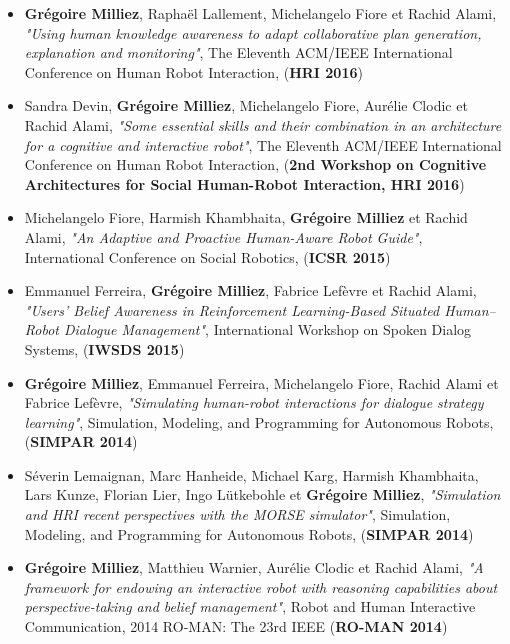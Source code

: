 \documentclass[a4paper,11pt,twoside]{StyleThese}
\begin{document}
\begin{itemize}
\item \textbf{Grégoire Milliez}, Raphaël Lallement, Michelangelo Fiore et Rachid Alami, \textit{"Using human knowledge awareness to adapt collaborative plan generation, explanation and monitoring"}, The Eleventh ACM/IEEE International Conference on Human Robot Interaction, (\textbf{HRI 2016})
\item Sandra Devin, \textbf{Grégoire Milliez}, Michelangelo Fiore, Aurélie Clodic et Rachid Alami, \textit{"Some essential skills and their combination in an architecture for a cognitive and interactive robot"}, The Eleventh ACM/IEEE International Conference on Human Robot Interaction, (\textbf{2nd Workshop on Cognitive Architectures for Social Human-Robot Interaction,  HRI 2016})
\item Michelangelo Fiore, Harmish Khambhaita, \textbf{Grégoire Milliez} et Rachid Alami, \textit{"An Adaptive and Proactive Human-Aware Robot Guide"}, International Conference on Social Robotics, (\textbf{ICSR 2015})
\item Emmanuel Ferreira, \textbf{Grégoire Milliez}, Fabrice Lefèvre et Rachid Alami, \textit{"Users’ Belief Awareness in Reinforcement Learning-Based Situated Human–Robot Dialogue Management"}, International Workshop on Spoken Dialog Systems, (\textbf{IWSDS 2015})
\item \textbf{Grégoire Milliez}, Emmanuel Ferreira, Michelangelo Fiore, Rachid Alami et Fabrice Lefèvre, \textit{"Simulating human-robot interactions for dialogue strategy learning"}, Simulation, Modeling, and Programming for Autonomous Robots, (\textbf{SIMPAR 2014})
\item Séverin Lemaignan, Marc Hanheide, Michael Karg, Harmish Khambhaita, Lars Kunze, Florian Lier, Ingo Lütkebohle et \textbf{Grégoire Milliez}, \textit{"Simulation and HRI recent perspectives with the MORSE simulator"}, Simulation, Modeling, and Programming for Autonomous Robots, (\textbf{SIMPAR 2014})
\item \textbf{Grégoire Milliez}, Matthieu Warnier, Aurélie Clodic et Rachid Alami, \textit{"A framework for endowing an interactive robot with reasoning capabilities about perspective-taking and belief management"}, Robot and Human Interactive Communication, 2014 RO-MAN: The 23rd IEEE (\textbf{RO-MAN 2014})
\end{itemize}

	
 	
\end{document}
